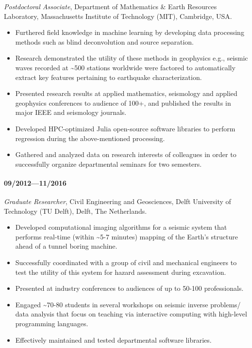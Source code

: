 \documentclass[9pt]{developercv} %
\begin{document}
\emph{Postdoctoral
Associate},
Department
of
Mathematics
\& Earth
Resources
Laboratory,
Massachusetts
Institute
of
Technology
(MIT),
Cambridge,
USA.

\begin{itemize}
\item
  Furthered
  field
  knowledge
  in
  machine
  learning
  by
  developing
  data
  processing
  methods
  such as
  blind
  deconvolution
  and
  source
  separation.
\item
  Research
  demonstrated
  the
  utility
  of these
  methods
  in
  geophysics
  e.g.,
  seismic
  waves
  recorded
  at
  \textasciitilde{}500
  stations
  worldwide
  were
  factored
  to
  automatically
  extract
  key
  features
  pertaining
  to
  earthquake
  characterization.
\item
  Presented
  research
  results
  at
  applied
  mathematics,
  seismology
  and
  applied
  geophysics
  conferences
  to
  audience
  of 100+,
  and
  published
  the
  results
  in major
  IEEE and
  seismology
  journals.
\item
  Developed
  HPC-optimized
  Julia
  open-source
  software
  libraries
  to
  perform
  regression
  during
  the
  above-mentioned
  processing.
\item
  Gathered
  and
  analyzed
  data on
  research
  interests
  of
  colleagues
  in order
  to
  successfully
  organize
  departmental
  seminars
  for two
  semesters.
\end{itemize}

\paragraph{09/2012---11/2016}\label{section-1}

\emph{Graduate
Researcher},
Civil
Engineering
and
Geosciences,
Delft
University
of
Technology
(TU
Delft),
Delft, The
Netherlands.

\begin{itemize}
\item
  Developed
  computational
  imaging
  algorithms
  for a
  seismic
  system
  that
  performs
  real-time
  (within
  \textasciitilde{}5-7
  minutes)
  mapping
  of the
  Earth's
  structure
  ahead of
  a tunnel
  boring
  machine.~
\item
  Successfully
  coordinated
  with a
  group of
  civil
  and
  mechanical
  engineers
  to test
  the
  utility
  of this
  system
  for
  hazard
  assessment
  during
  excavation.
\item
  Presented
  at
  industry
  conferences
  to
  audiences
  of up to
  50-100
  professionals.
\item
  Engaged
  \textasciitilde{}70-80
  students
  in
  several
  workshops
  on
  seismic
  inverse
  problems/
  data
  analysis
  that
  focus on
  teaching
  via
  interactive
  computing
  with
  high-level
  programming
  languages.
\item
  Effectively
  maintained
  and
  tested
  departmental
  software
  libraries.
\end{itemize}
\end{document}
